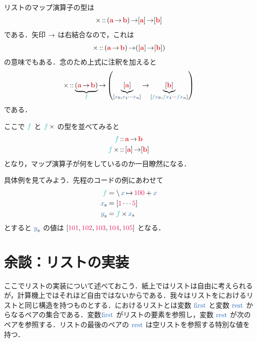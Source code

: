 \documentclass[a5paper,twoside,fleqn,draft]{jsbook}
\begin{document}
リストのマップ演算子の型は
\begin{equation}
  \hMap
  \hIsTypeOf{}(\hTypeName{a}\hFunctionArrow\hTypeName{b})\hFunctionArrow\hListConstruct{\hTypeName{a}}\hFunctionArrow[\hTypeName{b}]
\end{equation}
である．矢印 $\operatorname{\rightarrow}$ は右結合なので，これは
\begin{equation}
  \hMap
  \hIsTypeOf{}(\hTypeName{a}\hFunctionArrow\hTypeName{b})\hFunctionArrow(\hListConstruct{\hTypeName{a}}\hFunctionArrow[\hTypeName{b}])
\end{equation}
の意味でもある．念のため上式に注釈を加えると
\begin{equation}
  \hMap
  \hIsTypeOf\underbrace{\left(\hTypeName{a}\hFunctionArrow\hTypeName{b}\right)}_{\hFunc{f}}
  \hFunctionArrow\left(\underbrace{\hListConstruct{\hTypeName{a}}}_{[\hVar{x}_0,\hVar{x}_1\dotsb \hVar{x}_n]}
  \hFunctionArrow\underbrace{[\hTypeName{b}]}_{[\hFunc{f}\hVar{x}_0,\hFunc{f}\hVar{x}_1\dotsb \hFunc{f}\hVar{x}_n]}\right)
\end{equation}
である．

ここで $\hFunc{f}$ と $\hFunc{f}\hMap$ の型を並べてみると
\begin{align}
  \hFunc{f}
  &\hIsTypeOf\hTypeName{a}\hFunctionArrow\hTypeName{b}\\
  \hFunc{f}\hMap
  &\hIsTypeOf{}\hListConstruct{\hTypeName{a}}\hFunctionArrow[\hTypeName{b}]
\end{align}
となり，マップ演算子が何をしているのか一目瞭然になる．


具体例を見てみよう．先程の\python コードの例にあわせて
\begin{align}
  \hFunc{f}
  &=\mLambda\hVar{x}\mLambdaArrow\hConstant{100}+\hVar{x}\\
  \hListVar{x}
  &=[\hConstant{1}\dotsb\hConstant{5}]\\
  \hListVar{y}
  &=\hFunc{f}\hMap\hListVar{x}
\end{align}
とすると $\hListVar{y}$ の値は $[\hConstant{101},\hConstant{102},\hConstant{103},\hConstant{104},\hConstant{105}]$ となる．

\section{余談：リストの実装}

ここでリストの実装について述べておこう．紙上ではリストは自由に考えられるが，計算機上ではそれほど自由ではないからである．我々はリストを\lisp におけるリストと同じ構造を持つものとする．\lisp におけるリストとは変数 $\mFirstVar$ と変数 $\mRestVar$ からなるペアの集合である．変数$\mFirstVar$ がリストの要素を参照し，変数 $\mRestVar$ が次のペアを参照する．リストの最後のペアの $\mRestVar$ は空リストを参照する特別な値を持つ．
\end{document}
